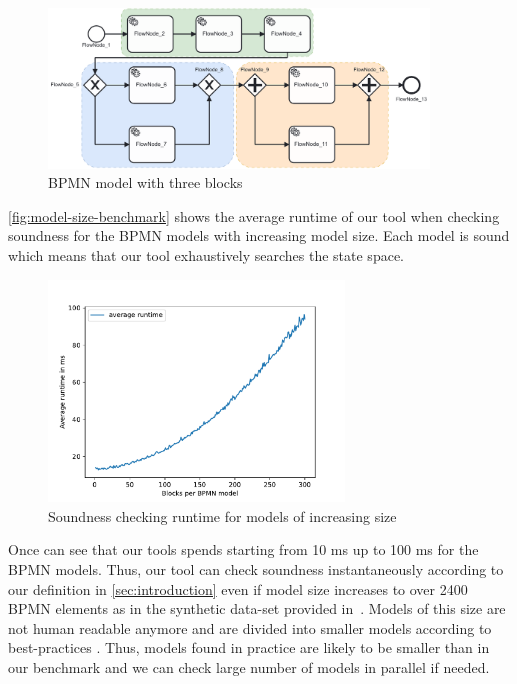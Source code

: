 \documentclass[runningheads]{llncs}
\begin{document}
\begin{figure}[ht]
	\centering
	\includegraphics[width=0.9\textwidth]{images/three-blocks}
	\caption{BPMN model with three blocks~\cite{krauterHigherorderTransformationApproach2023}}
	\label{fig:three-block-example}
\end{figure}

\autoref{fig:model-size-benchmark} shows the average runtime of our tool when checking soundness for the BPMN models with increasing model size.
Each model is sound which means that our tool exhaustively searches the state space.

\begin{figure}[ht]
	\centering
	\includegraphics[width=0.7\textwidth]{images/model-size-benchmark}
	\caption{Soundness checking runtime for models of increasing size}
	\label{fig:model-size-benchmark}
\end{figure}

Once can see that our tools spends starting from 10 ms up to 100 ms for the BPMN models.
Thus, our tool can check soundness instantaneously according to our definition in \autoref{sec:introduction} even if model size increases to over 2400 BPMN elements as in the synthetic data-set provided in~\cite{krauterHigherorderTransformationApproach2023}.
Models of this size are not human readable anymore and are divided into smaller models according to best-practices \cite{fahlandAnalysisDemandInstantaneous2011}.
Thus, models found in practice are likely to be smaller than in our benchmark and we can check large number of models in parallel if needed.
\end{document}
